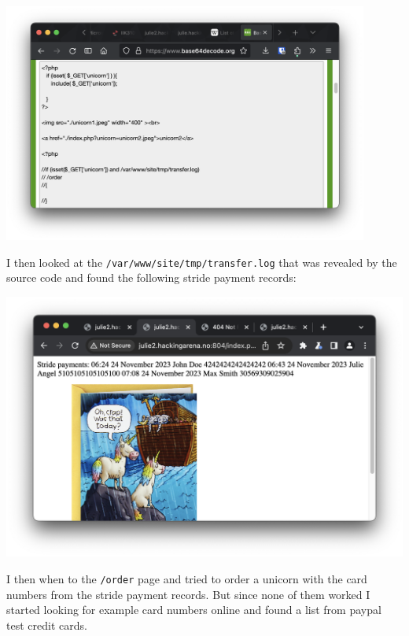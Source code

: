 \begin{center}
    \includegraphics[width=12cm]{img/Web hacking/Order a Unicorn/Screenshot 2023-11-24 at 12.54.54.png}
\end{center}

I then looked at the \texttt{/var/www/site/tmp/transfer.log} that was revealed by the source code and found the following stride payment records:

\begin{center}
    \includegraphics[width=14cm]{img/Web hacking/Order a Unicorn/Screenshot 2023-11-24 at 12.55.13.png}
\end{center}

I then when to the \texttt{/order} page and tried to order a unicorn with the card numbers from the stride payment records. But since none of them worked I started looking for example card numbers online and found a list from paypal test credit cards.

